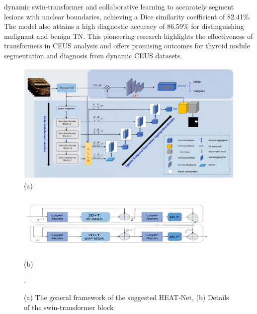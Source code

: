 \documentclass[a4paper,fleqn]{cas-sc}
\begin{document}
dynamic swin-transformer and collaborative learning to accurately segment lesions with unclear boundaries, achieving a Dice similarity coefficient of 82.41\%. The model also attains a high diagnostic accuracy of 86.59\% for distinguishing malignant and benign \ac{TN}. This pioneering research highlights the effectiveness of transformers in CEUS analysis and offers promising outcomes for thyroid nodule segmentation and diagnosis from dynamic CEUS datasets.

\begin{figure}[t!]
\centering
\includegraphics[width=1\columnwidth]{fig7_a.pdf}\\
(a)\\
\includegraphics[width=10cm, height=3.5cm]{fig7_b.pdf}\\
(b)\\
\caption{ (a) The general framework of the suggested HEAT-Net, (b) Details of the swin-transformer block  \cite{chen2023joint}}.
\label{fig7}
\end{figure}
\end{document}
